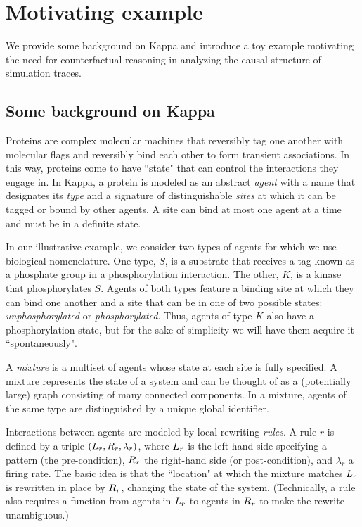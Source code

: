 
\section{Motivating example}\label{sec:example}

We provide some background on Kappa and introduce a toy
example motivating the need for counterfactual reasoning in analyzing
the causal structure of simulation traces.

\subsection{Some background on Kappa}\label{sec:background}

Proteins are complex molecular machines that reversibly tag one
another with molecular flags and reversibly bind each other to form
transient associations.  In this way, proteins come to have ``state"
that can control the interactions they engage in. In Kappa, a protein
is modeled as an abstract \emph{agent} with a name that designates its
\emph{type} and a signature of distinguishable \emph{sites} at which
it can be tagged or bound by other agents. A site can bind at most one
agent at a time and must be in a definite state.

In our illustrative example, we consider two types of agents for which
we use biological nomenclature. One type, $S$, is a substrate that
receives a tag known as a phosphate group in a phosphorylation
interaction. The other, $K$, is a kinase that phosphorylates
$S$. Agents of both types feature a binding site at which they can
bind one another and a site that can be in one of two possible states:
\emph{unphosphorylated} or \emph{phosphorylated}. Thus, agents of type
$K$ also have a phosphorylation state, but for the sake of simplicity
we will have them acquire it ``spontaneously".

A \emph{mixture} is a multiset of agents whose state at each site is
fully specified. A mixture represents the state of a system and can be
thought of as a (potentially large) graph consisting of many connected
components. In a mixture, agents of the same type are distinguished by
a unique global identifier. %



Interactions between agents are modeled by local rewriting
\emph{rules}.  A rule $r$ is defined by a triple
$(L_{r}, R_{r}, \lambda_r)$, where $L_{r}$ is the left-hand
side specifying a pattern (the pre-condition), $R_{r}$ the
right-hand side (or post-condition), and $\lambda_r$ a firing rate.
The basic idea is that the ``location" at which the mixture matches
$L_{r}$ is rewritten in place by $R_{r}$, changing the state of
the system. (Technically, a rule also requires a function from agents
in $L_{r}$ to agents in $R_{r}$ to make the rewrite
unambiguous.)

